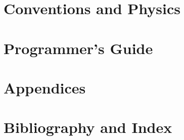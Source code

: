 \documentclass{book}
\begin{document}
\part{Conventions and Physics}















\part{Programmer's Guide}
















\appendix
\part{Appendices}


\part{Bibliography and Index}

\cleardoublepage
{}
{}


\cleardoublepage
{}
{}
\printindex[routine]

\cleardoublepage
{}
{}
\printindex
\end{document}
